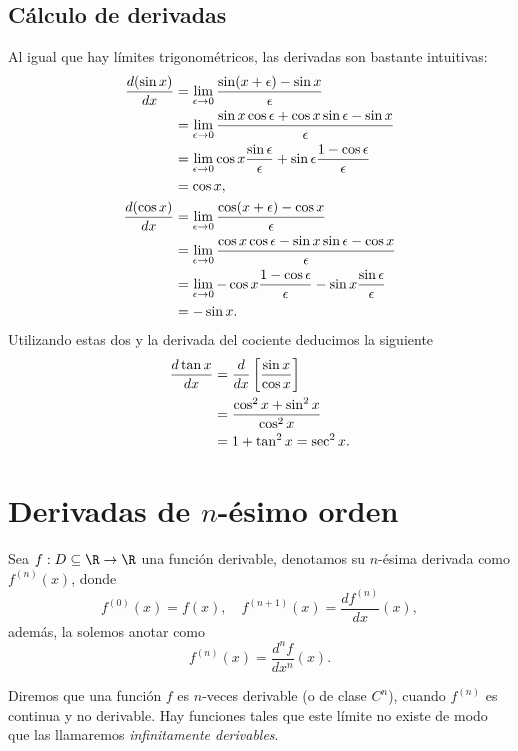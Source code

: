 \documentclass[11pt,oneside,a4paper]{book}
\begin{document}
\subsection*{Cálculo de derivadas}
Al igual que hay límites trigonométricos, las derivadas son bastante intuitivas:
\begin{align}
\frac{d(\sin x)}{dx}&=\lim_{\epsilon\to 0}\frac{\sin(x+\epsilon)-\sin x}{\epsilon}\notag\\
&=\lim_{\epsilon\to 0}\frac{\sin x\cos\epsilon+\cos x\sin\epsilon-\sin x}{\epsilon}\notag\\
&=\lim_{\epsilon\to 0}\cos x\frac{\sin\epsilon}{\epsilon}+\sin\epsilon\frac{1-\cos\epsilon}{\epsilon}\notag\\
&=\cos x,\\
\frac{d(\cos x)}{dx}&=\lim_{\epsilon\to 0}\frac{\cos(x+\epsilon)-\cos x}{\epsilon}\notag\\
&=\lim_{\epsilon\to 0}\frac{\cos x\cos\epsilon-\sin x\sin\epsilon-\cos x}{\epsilon}\notag\\
&=\lim_{\epsilon\to 0}-\cos x\frac{1-\cos\epsilon}{\epsilon}-\sin x\frac{\sin\epsilon}{\epsilon}\notag\\
&=-\sin x.
\end{align}
Utilizando estas dos y la derivada del cociente deducimos la siguiente
\begin{align}
\frac{d\tan x}{dx}&=\frac{d}{dx}\left[\frac{\sin x}{\cos x}\right]\notag\\
&=\frac{\cos^2x+\sin^2x}{\cos^2x}\notag\\
&=1+\tan^2x=\sec^2x.
\end{align}

\section{Derivadas de $n$-ésimo orden}
\begin{mydef}
Sea $f:D\subseteq\R\rightarrow\R$ una función derivable, denotamos su $n$-ésima derivada como $f^{(n)}(x)$, donde
$$f^{(0)}(x)=f(x),\quad f^{(n+1)}(x)=\frac{df^{(n)}}{dx}(x),$$
además, la solemos anotar como
$$f^{(n)}(x)=\frac{d^nf}{dx^n}(x).$$
\end{mydef}
Diremos que una función $f$ es $n$-veces derivable (o de clase $C^n$), cuando $f^{(n)}$ es continua y no derivable. Hay funciones tales que este límite no existe de modo que las llamaremos \textit{infinitamente derivables}.
\end{document}
